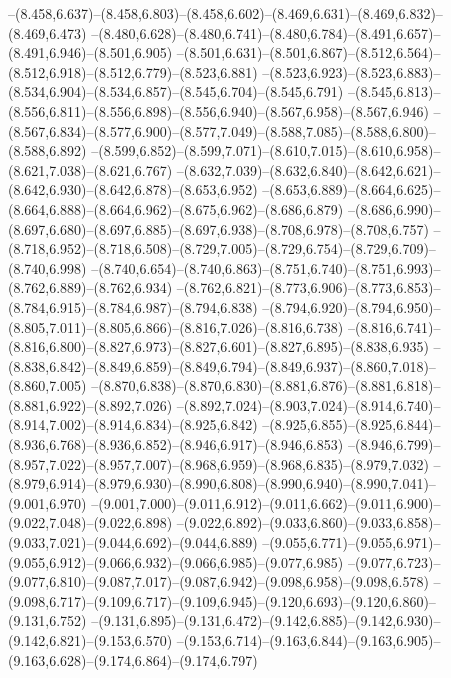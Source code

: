  --(8.458,6.637)--(8.458,6.803)--(8.458,6.602)--(8.469,6.631)--(8.469,6.832)--(8.469,6.473)%
  --(8.480,6.628)--(8.480,6.741)--(8.480,6.784)--(8.491,6.657)--(8.491,6.946)--(8.501,6.905)%
  --(8.501,6.631)--(8.501,6.867)--(8.512,6.564)--(8.512,6.918)--(8.512,6.779)--(8.523,6.881)%
  --(8.523,6.923)--(8.523,6.883)--(8.534,6.904)--(8.534,6.857)--(8.545,6.704)--(8.545,6.791)%
  --(8.545,6.813)--(8.556,6.811)--(8.556,6.898)--(8.556,6.940)--(8.567,6.958)--(8.567,6.946)%
  --(8.567,6.834)--(8.577,6.900)--(8.577,7.049)--(8.588,7.085)--(8.588,6.800)--(8.588,6.892)%
  --(8.599,6.852)--(8.599,7.071)--(8.610,7.015)--(8.610,6.958)--(8.621,7.038)--(8.621,6.767)%
  --(8.632,7.039)--(8.632,6.840)--(8.642,6.621)--(8.642,6.930)--(8.642,6.878)--(8.653,6.952)%
  --(8.653,6.889)--(8.664,6.625)--(8.664,6.888)--(8.664,6.962)--(8.675,6.962)--(8.686,6.879)%
  --(8.686,6.990)--(8.697,6.680)--(8.697,6.885)--(8.697,6.938)--(8.708,6.978)--(8.708,6.757)%
  --(8.718,6.952)--(8.718,6.508)--(8.729,7.005)--(8.729,6.754)--(8.729,6.709)--(8.740,6.998)%
  --(8.740,6.654)--(8.740,6.863)--(8.751,6.740)--(8.751,6.993)--(8.762,6.889)--(8.762,6.934)%
  --(8.762,6.821)--(8.773,6.906)--(8.773,6.853)--(8.784,6.915)--(8.784,6.987)--(8.794,6.838)%
  --(8.794,6.920)--(8.794,6.950)--(8.805,7.011)--(8.805,6.866)--(8.816,7.026)--(8.816,6.738)%
  --(8.816,6.741)--(8.816,6.800)--(8.827,6.973)--(8.827,6.601)--(8.827,6.895)--(8.838,6.935)%
  --(8.838,6.842)--(8.849,6.859)--(8.849,6.794)--(8.849,6.937)--(8.860,7.018)--(8.860,7.005)%
  --(8.870,6.838)--(8.870,6.830)--(8.881,6.876)--(8.881,6.818)--(8.881,6.922)--(8.892,7.026)%
  --(8.892,7.024)--(8.903,7.024)--(8.914,6.740)--(8.914,7.002)--(8.914,6.834)--(8.925,6.842)%
  --(8.925,6.855)--(8.925,6.844)--(8.936,6.768)--(8.936,6.852)--(8.946,6.917)--(8.946,6.853)%
  --(8.946,6.799)--(8.957,7.022)--(8.957,7.007)--(8.968,6.959)--(8.968,6.835)--(8.979,7.032)%
  --(8.979,6.914)--(8.979,6.930)--(8.990,6.808)--(8.990,6.940)--(8.990,7.041)--(9.001,6.970)%
  --(9.001,7.000)--(9.011,6.912)--(9.011,6.662)--(9.011,6.900)--(9.022,7.048)--(9.022,6.898)%
  --(9.022,6.892)--(9.033,6.860)--(9.033,6.858)--(9.033,7.021)--(9.044,6.692)--(9.044,6.889)%
  --(9.055,6.771)--(9.055,6.971)--(9.055,6.912)--(9.066,6.932)--(9.066,6.985)--(9.077,6.985)%
  --(9.077,6.723)--(9.077,6.810)--(9.087,7.017)--(9.087,6.942)--(9.098,6.958)--(9.098,6.578)%
  --(9.098,6.717)--(9.109,6.717)--(9.109,6.945)--(9.120,6.693)--(9.120,6.860)--(9.131,6.752)%
  --(9.131,6.895)--(9.131,6.472)--(9.142,6.885)--(9.142,6.930)--(9.142,6.821)--(9.153,6.570)%
  --(9.153,6.714)--(9.163,6.844)--(9.163,6.905)--(9.163,6.628)--(9.174,6.864)--(9.174,6.797)%
